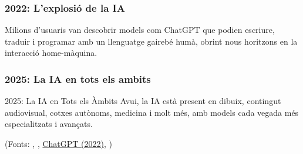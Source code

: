 \begin{enumerate}
        \subsubsection{2022: L'explosió de la IA}
         Milions d’usuaris van descobrir models com ChatGPT que podien escriure, traduir i programar amb un llenguatge gairebé humà, obrint nous horitzons en la interacció home-màquina.
        \subsubsection{2025: La IA en tots els ambits}
        2025: La IA en Tots els Àmbits
        Avui, la IA està present en dibuix, contingut audiovisual, cotxes autònoms, medicina i molt més, amb models cada vegada més especialitzats i avançats.

\end{enumerate}

(Fonts: \cite{McCarthy_Minsky_Rochester_Shannon_2006}, \cite{deep-blue},
\href{https://openai.com/index/chatgpt/}{ChatGPT (2022)},
\cite{10.1093/mind/LIX.236.433}
)
